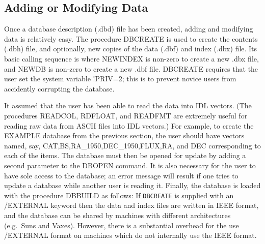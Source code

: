 \subsection{Adding or Modifying Data}

Once a database description (.dbd) file has been created, adding and 
modifying data is relatively easy.   The procedure DBCREATE is used
to create the contents (.dbh) file, and optionally, new copies of the 
data (.dbf) and index (.dbx) file.  Its basic calling sequence is
where NEWINDEX is non-zero to create a new .dbx file, and NEWDB is non-zero
to create a new .dbf file.  DBCREATE requires that the user set the system
variable !PRIV=2; this is to prevent novice users from accidently corrupting
the database.

It assumed that the user has been able to read the data into IDL vectors.
(The procedures READCOL, RDFLOAT, and READFMT are extremely useful for 
reading raw data from ASCII files into IDL vectors.)   For example, to create 
the EXAMPLE database from the previous section, the user should have vectors
named, say, CAT,BS,RA\_1950,DEC\_1950,FLUX,RA, and DEC corresponding to 
each of the items.   The database must then be opened for update by
adding a second parameter to the DBOPEN command.  It is also necessary
for the user to have sole access to the database; an error message will
result if one tries to update a database while another user is reading it.
Finally, the database is loaded with the procedure
DBBUILD as follows:
\exbegin
{}
\exend
If {\tt DBCREATE} is supplied with an /EXTERNAL keyword then the data
and index files are written in IEEE format, and the database can be
shared by machines with different architectures (e.g.\ Suns and Vaxes).
However, there is a substantial overhead for the use /EXTERNAL format 
on machines which do not internally use the IEEE format.

